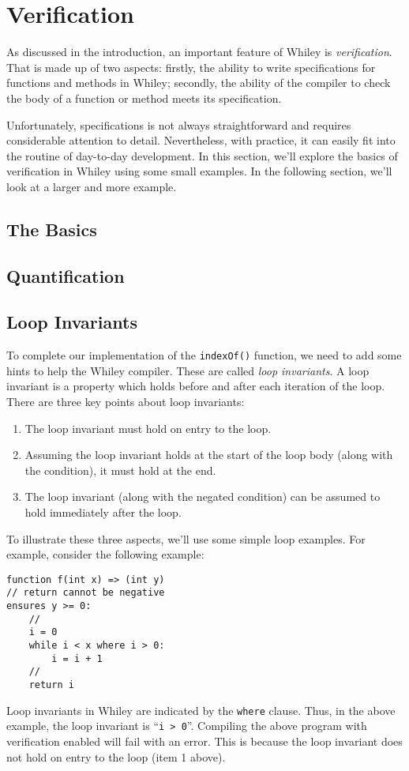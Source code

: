 \newpage
\section{Verification}

As discussed in the introduction, an important feature of Whiley is
{\em verification}.  That is made up of two aspects: firstly, the
ability to write specifications for functions and methods in Whiley;
secondly, the ability of the compiler to check the body of a function
or method meets its specification.

Unfortunately, specifications is not always straightforward and
requires considerable attention to detail.  Nevertheless, with
practice, it can easily fit into the routine of day-to-day
development.  In this section, we'll explore the basics of
verification in Whiley using some small examples.  In the following
section, we'll look at a larger and more example.

\subsection{The Basics}
\subsection{Quantification}
\subsection{Loop Invariants}

To complete our implementation of the \lstinline{indexOf()} function,
we need to add some hints to help the Whiley compiler.  These are
called {\em loop invariants}.  A loop invariant is a property which
holds before and after each iteration of the loop.  There are three
key points about loop invariants:
\begin{enumerate}
\item The loop invariant must hold on entry to the loop.
\item Assuming the loop invariant holds at the start of the loop body
  (along with the condition), it must hold at the end.
\item The loop invariant (along with the negated condition) can be
  assumed to hold immediately after the loop.
\end{enumerate}

To illustrate these three aspects, we'll use some simple loop
examples.  For example, consider the following example:

\begin{lstlisting}
function f(int x) => (int y)
// return cannot be negative
ensures y >= 0:
    //
    i = 0
    while i < x where i > 0:
        i = i + 1 
    //
    return i
\end{lstlisting}

Loop invariants in Whiley are indicated by the \lstinline{where}
clause.  Thus, in the above example, the loop invariant is
``\lstinline{i > 0}''.  Compiling the above program with verification
enabled will fail with an error.   This is because the loop invariant
does not hold on entry to the loop (item 1 above).